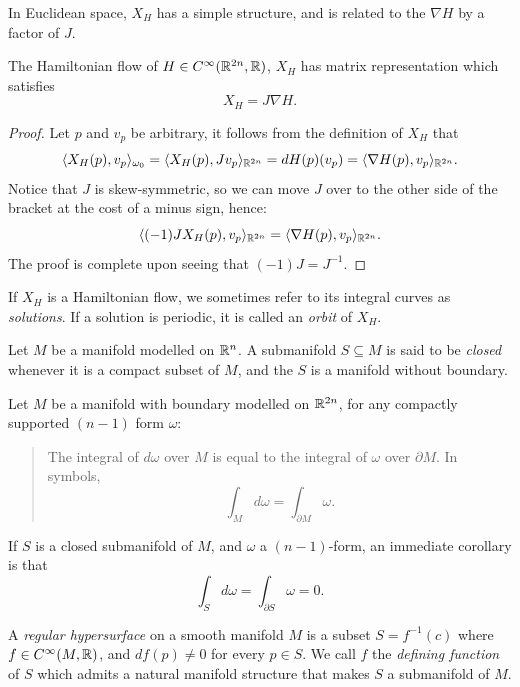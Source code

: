 \documentclass[../main-v2-manifolds.tex]{subfiles}
\begin{document}
In Euclidean space, $X_H$ has a simple structure, and is related to the $\nabla H$ by a factor of $J$. 
\begin{lemma}\label{lem:hvf in euclidean space formula}
    The Hamiltonian flow of $H\in C^\infty({\mathbb{R}^{2n}},\mathbb{R})$, $X_H$ has matrix representation which satisfies
    \begin{equation}
        X_H = J\nabla H.
        \label{eq: hvf in euclidean space formula}
    \end{equation}
\end{lemma}
\begin{proof}
    Let $p$ and $v_p$ be arbitrary, it follows from the definition of $X_H$ that
    \[
        \langle X_H(p), v_p\rangle_{\omega_0} = \langle X_H(p), Jv_p\rangle_{{\mathbb{R}^{2n}}} = dH(p)(v_p) = \langle\nabla H(p), v_p\rangle_{{\mathbb{R}^{2n}}}.
    \]
    Notice that $J$ is skew-symmetric, so we can move $J$ over to the other side of the bracket at the cost of a minus sign, hence:
    \[
        \langle (-1)J X_H(p), v_p\rangle_{{\mathbb{R}^{2n}}} = \langle \nabla H(p),v_p\rangle_{{\mathbb{R}^{2n}}}.
    \]
    The proof is complete upon seeing that $(-1)J=J^{-1}$.
\end{proof}
\begin{remark}
    If $X_H$ is a Hamiltonian flow, we sometimes refer to its integral curves as \emph{solutions}. If a solution is periodic, it is called an \emph{orbit} of $X_H$.
\end{remark}
\begin{definition}\label{def:closed-submanifolds}
    Let $M$ be a manifold modelled on ${\mathbb{R}^n}$. A submanifold $S\subseteq M$ is said to be \emph{closed} whenever it is a compact subset of $M$, and the $S$ is a manifold without boundary.
\end{definition}
\begin{remark}
    Let $M$ be a manifold with boundary modelled on ${\mathbb{R}^{2n}}$, for any compactly supported $(n-1)$ form $\omega$:
    \begin{quote}
        The integral of $d\omega$ over $M$ is equal to the integral of $\omega$ over $\partial M$. In symbols,
        \[\int_{M}d\omega = \int_{\partial M}\omega.\]
    \end{quote}
    If $S$ is a closed submanifold of $M$, and $\omega$ a $(n-1)$-form, an immediate corollary is that
    \[\int_S d\omega = \int_{\partial S}\omega = 0.\]
\end{remark}
\begin{definition}\label{def:regular hypersurface}
    A \emph{regular hypersurface} on a smooth manifold $M$ is a subset $S = f^{-1}(c)$ where $f\in C^\infty(M,\mathbb{R})$, and $df(p)\neq 0$ for every $p\in S$. We call $f$ the \emph{defining function} of $S$ which admits a natural manifold structure that makes $S$ a submanifold of $M$. 
\end{definition}
\end{document}
